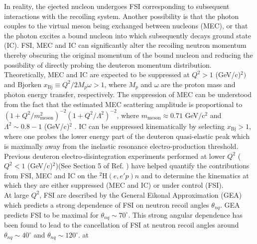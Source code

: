 \indent In reality, the ejected nucleon undergoes FSI corresponding to subsequent interactions with the recoiling system. Another possibility is that the
photon couples to the virtual meson being exchanged between nucleons (MEC), or that the photon excites a bound nucleon into \DIFdelbegin {}\DIFdelend \DIFaddbegin {}\DIFaddend which subsequently
decays \DIFdelbegin {}\DIFdelend \DIFaddbegin {}\DIFaddend ground state (IC).  FSI, MEC and IC can significantly alter the recoiling neutron
momentum thereby obscuring the original momentum of the bound nucleon and reducing the possibility of directly probing the deuteron momentum distribution. \\
\indent Theoretically, MEC and IC are expected to be suppressed at $Q^{2}>1$ (GeV/c)$^{2})$ and Bjorken $x_{\mathrm{Bj}}\equiv Q^{2}/2M_{p}\omega>1$, where $M_{p}$ and $\omega$ are the proton mass and photon energy transfer, respectively\DIFaddbegin {}\DIFaddend .
The suppression of MEC can be understood from the fact that the estimated MEC scattering amplitude is proportional to  $(1 + Q^{2}/m^{2}_{\mathrm{meson}})^{-2}(1+Q^{2}/\Lambda^{2})^{-2}$, where $m_{\mathrm{meson}}\approx0.71$ GeV/c$^{2}$ and
$\Lambda^{2}\sim 0.8-1 $ (GeV/c)$^{2}$ \cite{Sargsian_2001}. IC can be suppressed kinematically by selecting $x_{\mathrm{Bj}}>1$, where one probes the lower energy \DIFaddbegin \DIFadd{($\omega$) }\DIFaddend part of the deuteron quasi-elastic peak which is maximally \DIFdelbegin {}\DIFdelend away from the inelastic resonance
electro-production threshold. Previous deuteron electro-disintegration experiments performed at lower $Q^{2}$ ($Q^{2}<1$ (GeV/c)$^{2}$)(See Section 5 of Ref. \cite{sargsian_2015}) have helped quantify the contributions
from FSI, MEC and IC on the $^{2}\mathrm{H}(e,e'p)n$ \DIFdelbegin {}\DIFdelend \DIFaddbegin {}\DIFaddend and to determine the kinematics at which they are either suppressed (MEC and IC) or under control (FSI).  \\
\indent At large $Q^{2}$, FSI are described by the General Eikonal Approximation (GEA) \cite{Sargsian_2001,PhysRevC.56.1124,sargsian_2015}\DIFaddbegin \DIFadd{, }\DIFaddend which predicts a strong dependence of FSI on neutron recoil angles $\theta_{nq}$.
GEA predicts FSI to be maximal for $\theta_{nq}\sim70^{\circ}$. This strong angular dependence has been found to lead to the cancellation of FSI at neutron recoil angles around $\theta_{nq}\sim40^{\circ}$ and $\theta_{nq}\sim120^{\circ}$. \DIFdelbegin {}\DIFdelend \DIFaddbegin {}\DIFaddend at
